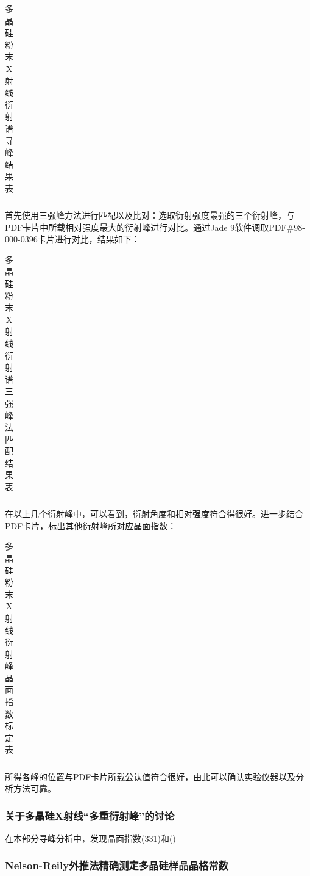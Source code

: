 \documentclass{thuemp}
\begin{document}
\begin{table}[H]
    \centering
    \captionnamefont{\wuhao\bf\heiti}
    \captiontitlefont{\wuhao\bf\heiti}
    \caption{多晶硅粉末X射线衍射谱寻峰结果表}
    \label{tab:si_xrd}
    \liuhao
    \begin{tabular}{ccccc}
        \toprule
        \midrule
        \bottomrule
    \end{tabular}
\end{table}

首先使用三强峰方法进行匹配以及比对：选取衍射强度最强的三个衍射峰，与PDF卡片中所载相对强度最大的衍射峰进行对比。通过Jade 9软件调取PDF\#98-000-0396卡片进行对比，结果如下：

\begin{table}[H]
    \centering
    \captionnamefont{\wuhao\bf\heiti}
    \captiontitlefont{\wuhao\bf\heiti}
    \caption{多晶硅粉末X射线衍射谱三强峰法匹配结果表}
    \label{tab:si_xrd_tri_comp}
    \liuhao
    \begin{tabular}{ccccc}
        \toprule
        \midrule
        \bottomrule
    \end{tabular}
\end{table}

在以上几个衍射峰中，可以看到，衍射角度和相对强度符合得很好。进一步结合PDF卡片，标出其他衍射峰所对应晶面指数：

\begin{table}[H]
    \centering
    \captionnamefont{\wuhao\bf\heiti}
    \captiontitlefont{\wuhao\bf\heiti}
    \caption{多晶硅粉末X射线衍射峰晶面指数标定表}
    \label{tab:si_xrd_indexed}
    \liuhao
    \begin{tabular}{ccccc}
        \toprule
        \midrule
        \bottomrule
    \end{tabular}
\end{table}

所得各峰的位置与PDF卡片所载公认值符合很好，由此可以确认实验仪器以及分析方法可靠。

\subsubsection{关于多晶硅X射线“多重衍射峰”的讨论}

在本部分寻峰分析中，发现晶面指数(331)和()

\subsubsection{Nelson-Reily外推法精确测定多晶硅样品晶格常数}
\end{document}
